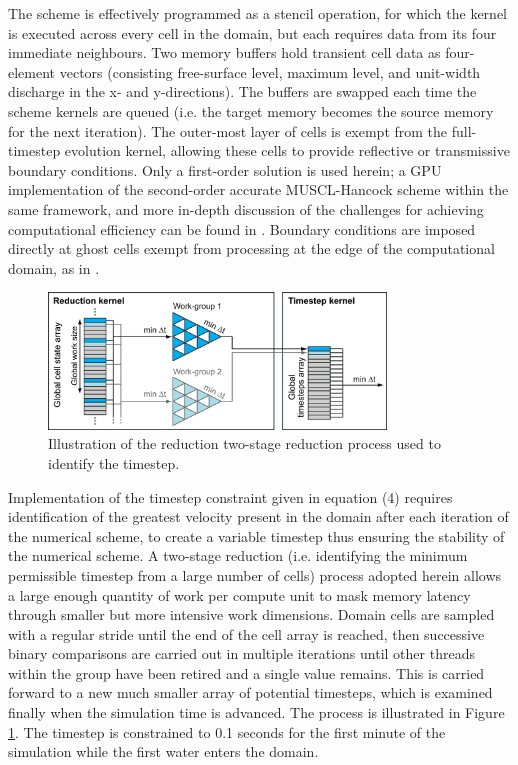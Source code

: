 The scheme is effectively programmed as a stencil operation, for which the kernel is executed across every cell in the domain, but each requires data from its four immediate neighbours. Two memory buffers hold transient cell data as four-element vectors (consisting free-surface level, maximum level, and unit-width discharge in the x- and y-directions). The buffers are swapped each time the scheme kernels are queued (i.e. the target memory becomes the source memory for the next iteration). The outer-most layer of cells is exempt from the full-timestep evolution kernel, allowing these cells to provide reflective or transmissive boundary conditions. Only a first-order solution is used herein; a GPU implementation of the second-order accurate MUSCL-Hancock scheme within the same framework, and more in-depth discussion of the challenges for achieving computational efficiency can be found in \citet{Smith2013}. Boundary conditions are imposed directly at ghost cells exempt from processing at the edge of the computational domain, as in \citet{Liang2010a}.

\begin{figure}[tpb]
\centering
\includegraphics[width=0.8\textwidth]{carlisle-figures/Figure2.png}
\caption{Illustration of the reduction two-stage reduction process used to identify the timestep.}
\label{ReductionDiagram}
\end{figure}

Implementation of the timestep constraint given in equation (4) requires identification of the greatest velocity present in the domain after each iteration of the numerical scheme, to create a variable timestep thus ensuring the stability of the numerical scheme. A two-stage reduction (i.e. identifying the minimum permissible timestep from a large number of cells) process adopted herein allows a large enough quantity of work per compute unit to mask memory latency through smaller but more intensive work dimensions. Domain cells are sampled with a regular stride until the end of the cell array is reached, then successive binary comparisons are carried out in multiple iterations until other threads within the group have been retired and a single value remains. This is carried forward to a new much smaller array of potential timesteps, which is examined finally when the simulation time is advanced. The process is illustrated in Figure \ref{ReductionDiagram}. The timestep is constrained to 0.1 seconds for the first minute of the simulation while the first water enters the domain. 

